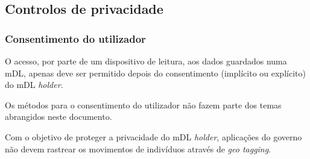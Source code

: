 \subsection{Controlos de privacidade}
\label{sec:org1279156}
\subsubsection{Consentimento do utilizador}
\label{sec:orga2915d6}

O acesso, por parte de um dispositivo de leitura, aos dados guardados numa
mDL, apenas deve ser permitido depois do consentimento (implícito ou
explícito) do mDL \emph{holder}.

Os métodos para o consentimento do utilizador não fazem parte dos temas
abrangidos neste documento.

Com o objetivo de proteger a privacidade do mDL \emph{holder}, aplicações do
governo não devem rastrear os movimentos de indivíduos através de \emph{geo
tagging}.


